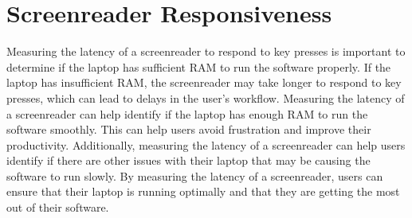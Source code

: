 \documentclass[14pt,letterpaper,twoside]{extreport}
\begin{document}
\pagebreak
	\hypertarget{screenreader-response}{}\section{Screenreader Responsiveness}\label{screenreader-response}
Measuring the latency of a screenreader to respond to key presses is important to determine if the laptop has sufficient RAM to run the software properly. If the laptop has insufficient RAM, the screenreader may take longer to respond to key presses, which can lead to delays in the user’s workflow. Measuring the latency of a screenreader can help identify if the laptop has enough RAM to run the software smoothly. This can help users avoid frustration and improve their productivity. Additionally, measuring the latency of a screenreader can help users identify if there are other issues with their laptop that may be causing the software to run slowly. By measuring the latency of a screenreader, users can ensure that their laptop is running optimally and that they are getting the most out of their software.
\end{document}
